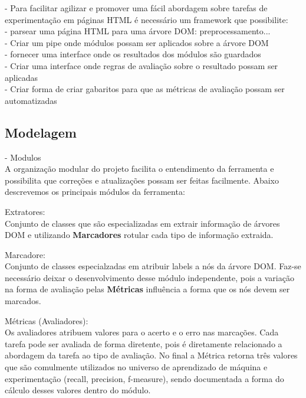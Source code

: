 \documentclass{acm_proc_article-sp}
\numberwithin{equation}{section}
\begin{document}
	- Para facilitar agilizar e promover uma fácil abordagem sobre tarefas
  de experimentação em páginas HTML é necessário um framework que
  possibilite: \\
		- parsear uma página HTML para uma árvore DOM: preprocessamento... \\
		- Criar um pipe onde módulos possam ser aplicados sobre a árvore DOM
    \\
		- fornecer uma interface onde os resultados dos módulos são
    guardados \\
		- Criar uma interface onde regras de avaliação sobre o resultado
    possam ser aplicadas \\
		- Criar forma de criar gabaritos para que as métricas de avaliação
    possam ser automatizadas \\


\subsection{Modelagem}

- Modulos \\
 A organização modular do projeto facilita o entendimento da ferramenta
 e possibilita que correções e atualizações possam ser feitas
 facilmente. Abaixo descrevemos os principais módulos da ferramenta:

 Extratores: \\
  Conjunto de classes que são especializadas em extrair informação de
  árvores DOM e utilizando {\bf Marcadores} rotular cada tipo de
  informação extraida.

 Marcadore: \\
  Conjunto de classes especialzadas em atribuir labels a nós da árvore
  DOM. Faz-se necessário deixar o desenvolvimento desse módulo
  independente, pois a variação na forma de avaliação pelas {\bf
  Métricas} influência a forma que os nós devem ser marcados.

 Métricas (Avaliadores): \\
  Os avaliadores atribuem valores para o acerto e o erro nas marcações.
  Cada tarefa pode ser avaliada de forma diretente, pois é diretamente
  relacionado a abordagem da tarefa ao tipo de avaliação. No final a
  Métrica retorna três valores que são comulmente utilizados no universo
  de aprendizado de máquina e experimentação (recall, precision,
  f-measure), sendo documentada a forma do cálculo desses valores dentro
  do módulo.
 
\end{document}
